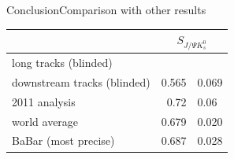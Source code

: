 \documentclass{beamer}
\newcommand{\SJPsi}{S_{J/\Psi K_s^0}}
\begin{document}
\begin{frame}{Conclusion}{Comparison with other results}
\begin{center}
\begin{tabular}{l r@{$\pm$}l}
\hline \hline
& \multicolumn{2}{c}{$\SJPsi$} \\ \hline
long tracks (blinded) & & \\
downstream tracks (blinded) & 0.565 & 0.069 \\ \hline
2011 analysis & 0.72 & 0.06 \\
world average & 0.679 & 0.020 \\
BaBar (most precise) & 0.687 & 0.028 \\ \hline \hline
\end{tabular}
\end{center}
\end{frame}



\end{document}
